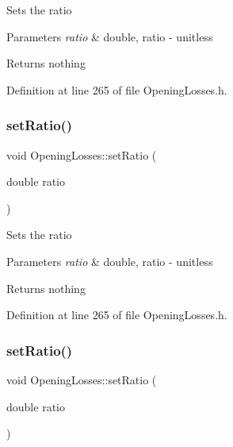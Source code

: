 Sets the ratio


\begin{DoxyParams}{Parameters}
{\em ratio} & double, ratio -\/ unitless\\
\hline
\end{DoxyParams}
\begin{DoxyReturn}{Returns}
nothing 
\end{DoxyReturn}


Definition at line 265 of file Opening\+Losses.\+h.

\mbox{\label{class_opening_losses_aab7f82f24511c37f0bc4b29cbc7239b5}} 
\subsubsection{\texorpdfstring{set\+Ratio()}{setRatio()}\hspace{0.1cm}{\footnotesize\ttfamily [2/3]}}
{\footnotesize\ttfamily void Opening\+Losses\+::set\+Ratio (\begin{DoxyParamCaption}\item[{double}]{ratio }\end{DoxyParamCaption})\hspace{0.3cm}{\ttfamily [inline]}}

Sets the ratio


\begin{DoxyParams}{Parameters}
{\em ratio} & double, ratio -\/ unitless\\
\hline
\end{DoxyParams}
\begin{DoxyReturn}{Returns}
nothing 
\end{DoxyReturn}


Definition at line 265 of file Opening\+Losses.\+h.

\mbox{\label{class_opening_losses_aab7f82f24511c37f0bc4b29cbc7239b5}} 
\subsubsection{\texorpdfstring{set\+Ratio()}{setRatio()}\hspace{0.1cm}{\footnotesize\ttfamily [3/3]}}
{\footnotesize\ttfamily void Opening\+Losses\+::set\+Ratio (\begin{DoxyParamCaption}\item[{double}]{ratio }\end{DoxyParamCaption})\hspace{0.3cm}{\ttfamily [inline]}}

